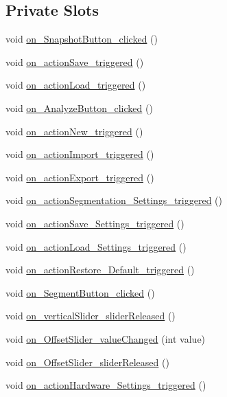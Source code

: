\subsection*{Private Slots}
\begin{DoxyCompactItemize}
\item 
void \hyperlink{class_v_s_a_g_u_i_a5e3ff078ad6165e40faa9cb9f21987b2}{on\+\_\+\+Snapshot\+Button\+\_\+clicked} ()
\item 
void \hyperlink{class_v_s_a_g_u_i_aac9be9b68262411f701939efcc805696}{on\+\_\+action\+Save\+\_\+triggered} ()
\item 
void \hyperlink{class_v_s_a_g_u_i_a3a2577bbd366b5c1ffd89a8f605ab9cd}{on\+\_\+action\+Load\+\_\+triggered} ()
\item 
void \hyperlink{class_v_s_a_g_u_i_aab3dd55cc1ac2bbd3d173ab1db3dda1e}{on\+\_\+\+Analyze\+Button\+\_\+clicked} ()
\item 
void \hyperlink{class_v_s_a_g_u_i_a9695404e3f9a371a8ce182e3609b62f4}{on\+\_\+action\+New\+\_\+triggered} ()
\item 
void \hyperlink{class_v_s_a_g_u_i_a2a0f1c84b6897d726f1bff1e1fd007a6}{on\+\_\+action\+Import\+\_\+triggered} ()
\item 
void \hyperlink{class_v_s_a_g_u_i_a60b18d934478ce1c1ed58de028425e2e}{on\+\_\+action\+Export\+\_\+triggered} ()
\item 
void \hyperlink{class_v_s_a_g_u_i_aab2a8088bbb1cd89da8f90776b227566}{on\+\_\+action\+Segmentation\+\_\+\+Settings\+\_\+triggered} ()
\item 
void \hyperlink{class_v_s_a_g_u_i_af385281e90a1a6652384eeb4f0f7d59b}{on\+\_\+action\+Save\+\_\+\+Settings\+\_\+triggered} ()
\item 
void \hyperlink{class_v_s_a_g_u_i_a27d11192fac9f1e8f15c6f5dc876e364}{on\+\_\+action\+Load\+\_\+\+Settings\+\_\+triggered} ()
\item 
void \hyperlink{class_v_s_a_g_u_i_a83ad26df88b8df9f3291b91dd6763e0c}{on\+\_\+action\+Restore\+\_\+\+Default\+\_\+triggered} ()
\item 
void \hyperlink{class_v_s_a_g_u_i_a231a3d41a13d0c59428db06cc445a34b}{on\+\_\+\+Segment\+Button\+\_\+clicked} ()
\item 
void \hyperlink{class_v_s_a_g_u_i_a161ef77cd94b239874ea35079aec9eb4}{on\+\_\+vertical\+Slider\+\_\+slider\+Released} ()
\item 
void \hyperlink{class_v_s_a_g_u_i_adce0126d190e2c65437c9b030a54ad40}{on\+\_\+\+Offset\+Slider\+\_\+value\+Changed} (int value)
\item 
void \hyperlink{class_v_s_a_g_u_i_a71b162bbcc83d85b4aa8f5e44888b35e}{on\+\_\+\+Offset\+Slider\+\_\+slider\+Released} ()
\item 
void \hyperlink{class_v_s_a_g_u_i_a488d4269d1243e88f0e1372db813858f}{on\+\_\+action\+Hardware\+\_\+\+Settings\+\_\+triggered} ()
\end{DoxyCompactItemize}
